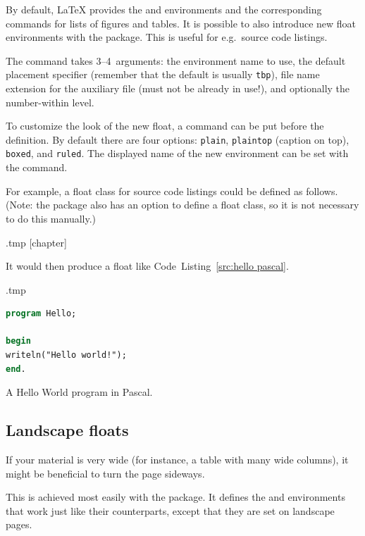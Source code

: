 By default, \LaTeX{} provides the  and  environments
and the corresponding commands for lists of figures and tables.
It is possible to also introduce new float environments with the  package.
This is useful for e.g.\ source code listings.

The  command takes 3--4~arguments:
the environment name to use,
the default placement specifier (remember that the default is usually \verb|tbp|),
file name extension for the auxiliary file (must not be already in use!),
and optionally the number-within level.

To customize the look of the new float,
a  command can be put before the definition.
By default there are four options: \verb|plain|, \verb|plaintop| (caption on top),
\verb|boxed|, and \verb|ruled|.
The displayed name of the new environment can be set with the  command.

For example, a float class for source code listings could be defined as follows.
(Note: the  package also has an option to define a float class,
so it is not necessary to do this manually.)
%
\begin{VerbatimOut}{\jobname.tmp}
[chapter]
\end{VerbatimOut}
\ExecuteExample  

It would then produce a float like Code~Listing~\ref{src:hello pascal}.
%
\begin{VerbatimOut}{\jobname.tmp}
\begin{sourcecode}[h]
\begin{lstlisting}[language=Pascal]
program Hello;

begin
writeln("Hello world!");
end.
\end{lstlisting}
\caption{A Hello World program in Pascal.}
\label{src:hello pascal}
\end{sourcecode}
\end{VerbatimOut}
\ExecuteExample


%
%
\subsection{Landscape floats}\label{sec:landscape floats}

If your material is very wide (for instance, a table with many wide columns),
it might be beneficial to turn the page sideways.

This is achieved most easily with the  package.
It defines the  and  environments
that work just like their counterparts, except that they are set on landscape pages.

